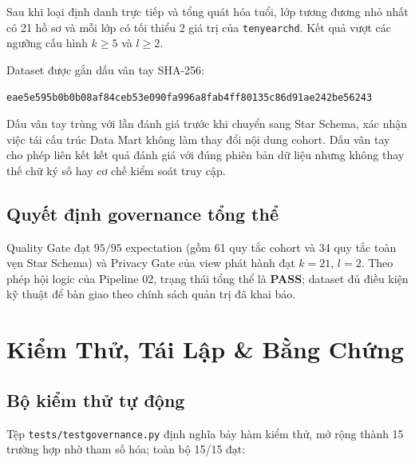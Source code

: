 \documentclass[11pt,a4paper]{article}
\renewcommand{\_}{\texorpdfstring{\origunderscore\allowbreak}{\origunderscore}}
\begin{document}
\begin{successbox}
Sau khi loại định danh trực tiếp và tổng quát hóa tuổi, lớp tương đương nhỏ nhất có 21 hồ sơ và mỗi lớp có tối thiểu 2 giá trị của \texttt{ten\_year\_chd}. Kết quả vượt các ngưỡng cấu hình $k\geq5$ và $l\geq2$.
\end{successbox}

Dataset được gắn dấu vân tay SHA-256:
\begin{center}
\small\texttt{eae5e595b0b0b08af84ceb53e090fa996a8fab4ff80135c86d91ae242be56243}
\end{center}
Dấu vân tay trùng với lần đánh giá trước khi chuyển sang Star Schema, xác nhận việc tái cấu trúc Data Mart không làm thay đổi nội dung cohort. Dấu vân tay cho phép liên kết kết quả đánh giá với đúng phiên bản dữ liệu nhưng không thay thế chữ ký số hay cơ chế kiểm soát truy cập.

\subsection{Quyết định governance tổng thể}

\begin{successbox}
Quality Gate đạt $95/95$ expectation (gồm 61 quy tắc cohort và 34 quy tắc toàn vẹn Star Schema) và Privacy Gate của view phát hành đạt $k=21$, $l=2$. Theo phép hội logic của Pipeline 02, trạng thái tổng thể là \textbf{PASS}; dataset đủ điều kiện kỹ thuật để bàn giao theo chính sách quản trị đã khai báo.
\end{successbox}

\section{Kiểm Thử, Tái Lập \& Bằng Chứng}

\subsection{Bộ kiểm thử tự động}

Tệp \texttt{tests/test\_governance.py} định nghĩa bảy hàm kiểm thử, mở rộng thành 15 trường hợp nhờ tham số hóa; toàn bộ 15/15 đạt:
\end{document}
